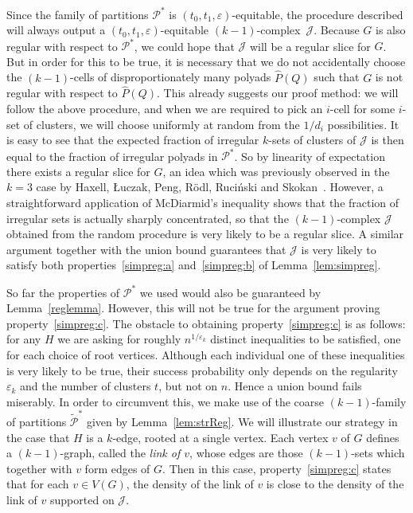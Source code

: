 \documentclass[12pt,a4paper]{amsart}
\let\eps\varepsilon
\newcommand{\cJ}{\mathcal{J}}
\newcommand{\Part}{\mathcal{P}}
\begin{document}
Since the family of partitions $\Part^*$ is $(t_0, t_1, \eps)$-equitable,
the procedure described will always output a $(t_0,
t_1, \eps)$-equitable $(k-1)$-complex~$\cJ$. Because $G$ is also
regular with respect to $\Part^*$, we could hope that $\cJ$ will be a regular slice
for $G$. But in order for
this to be true, it is necessary that we do not accidentally choose the
$(k-1)$-cells of disproportionately many polyads $\hat{P}(Q)$ such that
$G$ is not regular with respect to $\hat{P}(Q)$. This already suggests
our proof method: we will follow the above procedure, and when we are required
to pick an $i$-cell for some $i$-set of clusters, we will choose uniformly at
random from the $1/d_i$ possibilities. It is easy to see that the expected
fraction of irregular $k$-sets of clusters of $\cJ$ is then equal to the
fraction of irregular polyads in $\Part^*$. So by linearity of expectation there
exists a regular slice for $G$, an idea which was previously observed in the $k=3$ case by Haxell,
{\L}uczak, Peng, R{\"o}dl, Ruci{\'n}ski and Skokan~\cite{3CycleRamsey}. However,
a straightforward application of McDiarmid's inequality shows that the fraction
of irregular sets is actually sharply concentrated, so that the $(k-1)$-complex
$\cJ$ obtained from the random procedure is very likely to be a regular slice. A similar argument together with the union bound guarantees that $\cJ$ is very likely to satisfy both properties~\ref{simpreg:a} and~\ref{simpreg:b} of Lemma~\ref{lem:simpreg}.

So far the properties of $\Part^*$ we used would also be guaranteed by Lemma~\ref{reglemma}. However, this will not be true for the argument proving property~\ref{simpreg:c}.
The obstacle to obtaining property~\ref{simpreg:c} is as follows: for any $H$ we are asking for
roughly $n^{1/\eps_k}$ distinct inequalities to be satisfied, one for
each choice of root vertices. Although each individual one of these inequalities is very likely to be true, their success probability only depends on the regularity $\eps_k$ and the number of clusters $t$, but not on $n$. Hence a union bound fails miserably. In order to circumvent this, we make use of the coarse $(k-1)$-family of partitions $\tilde{\Part}^*$ given by Lemma~\ref{lem:strReg}. We will illustrate our strategy in the case that $H$ is a $k$-edge, rooted at a single vertex. Each vertex $v$ of $G$ defines a $(k-1)$-graph, called the \emph{link of $v$}, whose edges are those $(k-1)$-sets which together with $v$ form edges of $G$. Then in this case, property~\ref{simpreg:c} states that for each $v\in V(G)$, the density of the link of $v$ is close to the density of the link of $v$ supported on $\cJ$.
\end{document}
